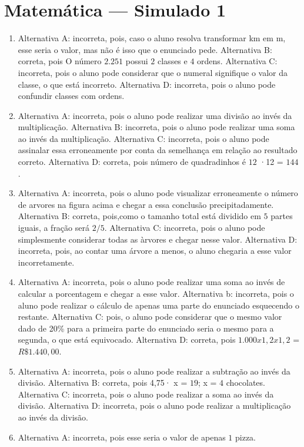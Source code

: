 \section*{Matemática — Simulado 1}

\begin{enumerate}
\item Alternativa A: incorreta, pois, caso o aluno resolva transformar km em
m, esse seria o valor, mas não é isso que o enunciado pede.
Alternativa B: correta, pois O número $2.251$ possui $2$ classes e $4$ ordens.
Alternativa C: incorreta, pois o aluno pode considerar que o numeral
signifique o valor da classe, o que está incorreto.
Alternativa D: incorreta, pois o aluno pode confundir classes com
ordens.
\item Alternativa A: incorreta, pois o aluno pode realizar uma divisão ao
invés da multiplicação.
Alternativa B: incorreta, pois o aluno pode realizar uma soma ao invés
da multiplicação.
Alternativa C: incorreta, pois o aluno pode assinalar essa erroneamente
por conta da semelhança em relação ao resultado correto.
Alternativa D: correta, pois número de quadradinhos é $12$ ·12 = $144$.
\item Alternativa A: incorreta, pois o aluno pode visualizar erroneamente o
número de arvores na figura acima e chegar a essa conclusão
precipitadamente.
Alternativa B: correta, pois,como o tamanho total está dividido em $5$
partes iguais, a fração será $2/5$.
Alternativa C: incorreta, pois o aluno pode simplesmente considerar
todas as àrvores e chegar nesse valor.
Alternativa D: incorreta, pois, ao contar uma árvore a menos, o aluno
chegaria a esse valor incorretamente.
\item Alternativa A: incorreta, pois o aluno pode realizar uma soma ao invés
de calcular a porcentagem e chegar a esse valor.
Alternativa b: incorreta, pois o aluno pode realizar o cálculo de apenas
uma parte do enunciado esquecendo o restante.
Alternativa C: pois, o aluno pode considerar que o mesmo valor dado de
20\% para a primeira parte do enunciado seria o mesmo para a segunda, o
que está equivocado.
Alternativa D: correta, pois $1.000 x 1,2 x 1,2$ = $R\$1.440,00$.
\item Alternativa A: incorreta, pois o aluno pode realizar a subtração ao
invés da divisão.
Alternativa B: correta, pois 4,75· x = $19$; x = $4$ chocolates.
Alternativa C: incorreta, pois o aluno pode realizar a soma ao invés da
divisão.
Alternativa D: incorreta, pois o aluno pode realizar a multiplicação ao
invés da divisão.
\item Alternativa A: incorreta, pois esse seria o valor de apenas $1$ pizza.

\end{enumerate}
